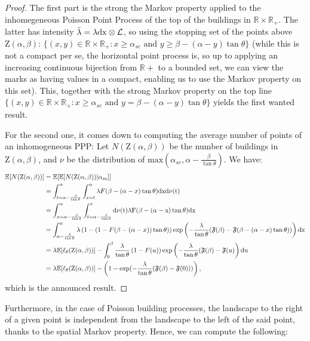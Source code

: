 \documentclass[10pt,english,a4paper]{smfart}
\theoremstyle{definition}
\theoremstyle{remark}
\newcommand{\R}{\mathbb{R}}
\newcommand{\Half}{\R \times \R_+}
\newcommand{\primi}{\mathfrak{F}}
\newcommand{\zone}{\mathrm{Z}}
\newcommand{\e}{\mathbb{E}}
\renewcommand{\max}{\text{max}}
\begin{document}
\begin{proof}
The first part is the strong the Markov property applied to the inhomegeneous Poisson Point Process of the top of the buildings in $\Half$. The latter has intensity $\tilde{\lambda} = \lambda \rm{d}x\otimes \mathcal{L}$, so using the stopping set of the points above $\zone(\alpha, \beta)$: $\{(x, y)\in \Half:x\geq \alpha_{sc} \text{ and }y\geq \beta-(\alpha-y)\tan\theta\}$ (while this is not a compact per se, the horizontal point process is, so up to applying an increasing continuous bijection from $\R+$ to a bounded set, we can view the marks as having values in a compact, enabling us to use the Markov property on this set). This, together with the strong Markov property on the top line $\{(x, y)\in \Half:x\geq \alpha_{sc} \text{ and }y= \beta-(\alpha-y)\tan\theta\}$ yields the first wanted result.

For the second one, it comes down to computing the average number of points of an inhomogeneous PPP: Let $N(\zone(\alpha, \beta))$ be the number of buildings in $\zone(\alpha, \beta)$, and $\nu$ be the distribution of $\max(\alpha_{sc},\alpha-\frac{\beta}{\tan\theta})$. We have:
\begin{align*}
    \e[N(\zone(\alpha, \beta))] &= \e[\e[N(\zone(\alpha, \beta))| \alpha_{sc}]]\\
    &= \int_{t = \alpha-\frac{\beta}{\tan\theta}}^{\alpha}\int_{x=t}^{\alpha} \lambda F(\beta-(\alpha-x)\tan\theta)\rm{d}x\rm{d}\nu(t)\\
    &= \int_{x = \alpha-\frac{\beta}{\tan\theta}}^{\alpha}\int_{t=\alpha-\frac{\beta}{\tan\theta}}^{x} \rm{d}\nu(t)\lambda F(\beta-(\alpha-x)\tan\theta)\rm{d}x\\
    &= \int_{\alpha-\frac{\beta}{\tan\theta}}^{\alpha}\lambda\left(1-(1- F(\beta-(\alpha-x))\tan\theta)\right)\exp\left(-\frac{\lambda}{\tan\theta}(\primi(\beta)-\primi(\beta-(\alpha-x)\tan\theta))\right)\rm{d}x\\
    &= \lambda\e[\ell_\theta(\zone(\alpha, \beta))] - \int_{0}^{\beta}\frac{\lambda}{\tan\theta}\left(1- F(u)\right)\exp\left(-\frac{\lambda}{\tan\theta}(\primi(\beta)-\primi(u)\right)\rm{d}u\\
    &= \lambda\e[\ell_\theta(\zone(\alpha, \beta))] - \left(1-\exp(-\frac{\lambda}{\tan\theta}(\primi(\beta)-\primi(0)))\right),
\end{align*}
which is the announced result.
\end{proof}

Furthermore, in the case of Poisson building processes, the landscape to the right of a given point is independent from the landscape to the left of the said point, thanks to the spatial Markov property. Hence, we can compute the following:
\end{document}
